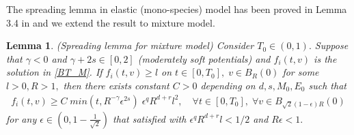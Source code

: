 \documentclass[reqno,10pt]{amsart}
\newtheorem{lemma}[theorem]{Lemma}
\numberwithin{equation}{section}
\begin{document}
The spreading lemma in elastic (mono-species) model has been proved in Lemma 3.4 in \cite{IM2020} and we extend the result to mixture model.

\begin{lemma} (Spreading lemma for mixture model) \label{spreading_M} Consider $T_0 \in (0,1).$
Suppose that $\gamma<0$ and $\gamma+2s \in [0,2]$ (moderately soft potentials) and $f_i(t,v)$ is the solution in \eqref{BT_M}. 
If $f_i(t,v) \geq l$ on $t \in [0,T_0],\; v\in B_R(0)$ for some $l > 0, R > 1,$ then there exists constant $C>0$ depending on $d, s, M_0, E_0$ such that
\begin{align*}
    f_i(t,v) \geq C\; min(t, R^{-\gamma}\epsilon^{2s})\; \epsilon^q R^{d+r}l^2, \quad \forall t\in[0,T_0],\; \forall v\in B_{\sqrt{2}(1-\epsilon)R}(0)
\end{align*}
for any $\epsilon \in (0, 1-\frac{1}{\sqrt{2}})$ that satisfied with $\epsilon^{q}R^{d+r}l < 1/2$ and $R\epsilon < 1.$
\end{lemma}
\end{document}
